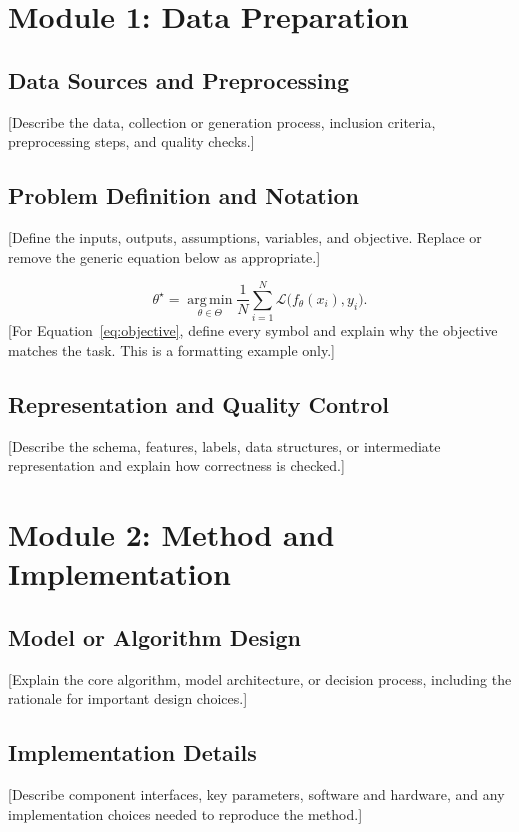 \documentclass[12pt,a4paper,oneside]{report}
\newcommand{\placeholder}[1]{{\color{gray}[#1]}}
\begin{document}
\section{Module 1: Data Preparation}
\subsection{Data Sources and Preprocessing}
\placeholder{Describe the data, collection or generation process, inclusion
criteria, preprocessing steps, and quality checks.}

\subsection{Problem Definition and Notation}
\placeholder{Define the inputs, outputs, assumptions, variables, and objective.
Replace or remove the generic equation below as appropriate.}

\begin{equation}
  \theta^{\star}
  = \operatorname*{arg\,min}_{\theta\in\Theta}
    \frac{1}{N}\sum_{i=1}^{N}\mathcal{L}\bigl(f_{\theta}(x_i),y_i\bigr).
  \label{eq:objective}
\end{equation}
\placeholder{For Equation~\ref{eq:objective}, define every symbol and explain
why the objective matches the task. This is a formatting example only.}

\subsection{Representation and Quality Control}
\placeholder{Describe the schema, features, labels, data structures, or
intermediate representation and explain how correctness is checked.}

\section{Module 2: Method and Implementation}
\subsection{Model or Algorithm Design}
\placeholder{Explain the core algorithm, model architecture, or decision
process, including the rationale for important design choices.}

\subsection{Implementation Details}
\placeholder{Describe component interfaces, key parameters, software and
hardware, and any implementation choices needed to reproduce the method.}
\end{document}

